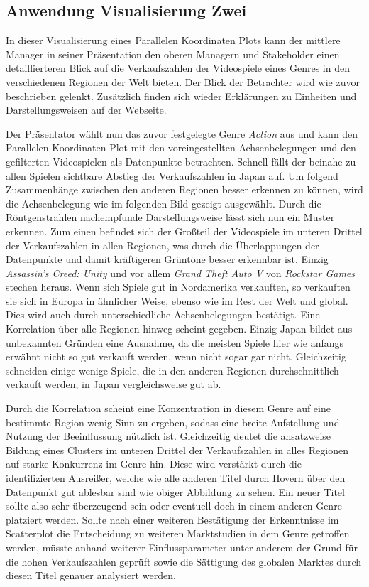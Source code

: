 \documentclass[usegeometry=true]{scrartcl}
\begin{document}
\subsection{Anwendung Visualisierung Zwei}
In dieser Visualisierung eines Parallelen Koordinaten Plots kann der mittlere Manager in seiner Präsentation den oberen Managern und Stakeholder einen detaillierteren Blick auf die Verkaufszahlen der Videospiele eines Genres in den verschiedenen Regionen der Welt bieten.
Der Blick der Betrachter wird wie zuvor beschrieben gelenkt.
Zusätzlich finden sich wieder Erklärungen zu Einheiten und Darstellungsweisen auf der Webseite.

Der Präsentator wählt nun das zuvor festgelegte Genre \textit{Action} aus und kann den Parallelen Koordinaten Plot mit den voreingestellten Achsenbelegungen und den gefilterten Videospielen als Datenpunkte betrachten. 
Schnell fällt der beinahe zu allen Spielen sichtbare Abstieg der Verkaufszahlen in Japan auf. 
Um folgend Zusammenhänge zwischen den anderen Regionen besser erkennen zu können, wird die Achsenbelegung wie im folgenden Bild gezeigt ausgewählt.
Durch die Röntgenstrahlen nachempfunde Darstellungsweise lässt sich nun ein Muster erkennen. 
Zum einen befindet sich der Großteil der Videospiele im unteren Drittel der Verkaufszahlen in allen Regionen, was durch die Überlappungen der Datenpunkte und damit kräftigeren Grüntöne besser erkennbar ist.
Einzig \textit{Assassin's Creed: Unity} und vor allem \textit{Grand Theft Auto V} von \textit{Rockstar Games} stechen heraus. 
Wenn sich Spiele gut in Nordamerika verkauften, so verkauften sie sich in Europa in ähnlicher Weise, ebenso wie im Rest der Welt und global.
Dies wird auch durch unterschiedliche Achsenbelegungen bestätigt. Eine Korrelation über alle Regionen hinweg scheint gegeben. 
Einzig Japan bildet aus unbekannten Gründen eine Ausnahme, da die meisten Spiele hier wie anfangs erwähnt nicht so gut verkauft werden, wenn nicht sogar gar nicht. 
Gleichzeitig schneiden einige wenige Spiele, die in den anderen Regionen durchschnittlich verkauft werden, in Japan vergleichsweise gut ab. 

Durch die Korrelation scheint eine Konzentration in diesem Genre auf eine bestimmte Region wenig Sinn zu ergeben, sodass eine breite Aufstellung und Nutzung der Beeinflussung nützlich ist.
Gleichzeitig deutet die ansatzweise Bildung eines Clusters im unteren Drittel der Verkaufszahlen in alles Regionen auf starke Konkurrenz im Genre hin. 
Diese wird verstärkt durch die identifizierten Ausreißer, welche wie alle anderen Titel durch Hovern über den Datenpunkt gut ablesbar sind wie obiger Abbildung zu sehen.
Ein neuer Titel sollte also sehr überzeugend sein oder eventuell doch in einem anderen Genre platziert werden. 
Sollte nach einer weiteren Bestätigung der Erkenntnisse im Scatterplot die Entscheidung zu weiteren Marktstudien in dem Genre getroffen werden, müsste anhand weiterer Einflussparameter unter anderem der Grund für die hohen Verkaufszahlen geprüft sowie die Sättigung des globalen Marktes durch diesen Titel genauer analysiert werden.
\end{document}
